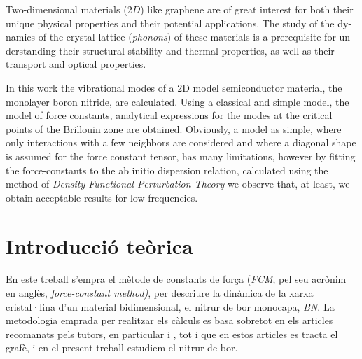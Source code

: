 \documentclass[12pt]{article} %
\begin{document}
\vspace{\baselineskip}

\begin{otherlanguage}{english}\itshape

Two-dimensional materials ($2D$) like graphene are of great interest for both their unique physical properties and their potential applications. The study of the dynamics of the crystal lattice (\textit{phonons}) of these materials is a prerequisite for understanding their structural stability and thermal properties, as well as their transport and optical properties.
 
 In this work the vibrational modes of a 2D model semiconductor material, the monolayer boron nitride, are calculated. Using a classical and simple model, the model of force constants, analytical expressions for the modes at the critical points of the Brillouin zone are obtained. Obviously, a model as simple, where only interactions with a few neighbors are considered and where a diagonal shape is assumed for the force constant tensor, has many limitations, however by fitting the force-constants to the ab initio  dispersion relation, calculated using the method of \emph{Density Functional Perturbation Theory} we observe that, at least, we obtain acceptable results for low frequencies.

\noindent 

\end{otherlanguage}



\section{Introducció teòrica}

En este treball s'empra el mètode de constants de força (\emph{FCM}, pel seu acrònim en anglès, \emph{\foreignlanguage{english}{force-constant method})}, per descriure la dinàmica de la xarxa cristal·lina d'un material bidimensional, el nitrur de bor monocapa, \emph{BN}. La metodologia emprada per realitzar els càlculs es basa sobretot en els articles recomanats pels tutors, en particular \cite{wirtz04_phonon_disper_graph_revis} i \cite{falkovsky08_symmet_const_phonon_disper_graph}, tot i que en estos articles es tracta el grafè, i en el present treball estudiem el nitrur de bor.
\end{document}
